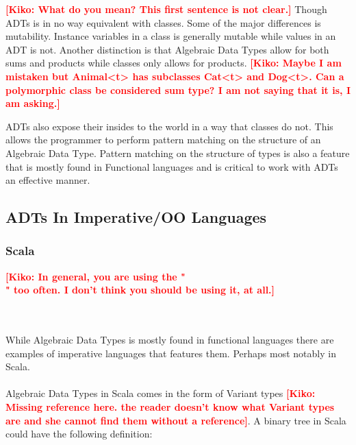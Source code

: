\documentclass[10pt]{report}
\newcommand{\KIKO}[1]{\textcolor{red}{\textbf{[Kiko: #1]}}}
\begin{document}
\KIKO{What do you mean? This first sentence is not clear.}
Though ADTs is in no way equivalent with classes. Some of the major differences is mutability. Instance variables in a class is generally mutable while values in an ADT is not. Another distinction is that Algebraic Data Types allow for both sums and products while classes only allows for products.
\KIKO{Maybe I am mistaken but Animal<t> has subclasses Cat<t> and Dog<t>. Can a polymorphic class be considered sum type? I am not saying that it is, I am asking.}

ADTs also expose their insides to the world in a way that classes do not. This allows the programmer to perform pattern matching on the structure of an Algebraic Data Type. Pattern matching on the structure of types is also a feature that is mostly found in Functional languages and is critical to work with ADTs an effective manner.
\subsection{ADTs In Imperative/OO Languages}
\subsubsection{Scala}

\KIKO{In general, you are using the "\\" too often. I don't think you should be using it, at all.}

\par{\noindent \\\\While Algebraic Data Types is mostly found in functional languages there are examples of imperative languages that features them. Perhaps most notably in Scala.}
\\
\\
Algebraic Data Types in Scala comes in the form of Variant types \KIKO{Missing reference here. the reader doesn't know what Variant types are and she cannot find them without a reference}. A binary tree in Scala could have the following definition:
\\
\\
\end{document}
